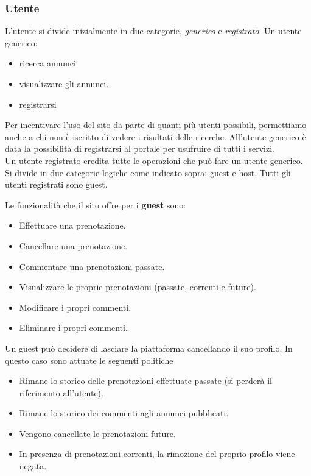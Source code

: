 \documentclass[1_relazione.tex]{subfiles}
\begin{document}
\subsubsection{Utente} 
L'utente si divide inizialmente in due categorie, \textit{generico} e \textit{registrato}. Un utente generico:
\begin{itemize}
\item ricerca annunci 
\item visualizzare gli annunci.
\item registrarsi
\end{itemize}
 Per incentivare l'uso del sito da parte di quanti più utenti possibili, permettiamo anche a chi non è iscritto di vedere i risultati delle ricerche. All'utente generico è data la possibilità di registrarsi al portale per usufruire di tutti i servizi.  \\
Un utente registrato eredita tutte le operazioni che può fare un utente generico. Si divide in due categorie logiche come indicato sopra: guest e host. Tutti gli utenti registrati sono guest. 

Le funzionalità che il sito offre per i \textbf{guest} sono: 
\begin{itemize}
\item Effettuare una prenotazione.
\item Cancellare una prenotazione.
\item Commentare una prenotazioni passate.
\item Visualizzare le proprie prenotazioni (passate, correnti e future).
\item Modificare i propri commenti.
\item Eliminare i propri commenti.
\end{itemize}

Un guest può decidere di lasciare la piattaforma cancellando il suo profilo. In questo caso sono attuate le seguenti politiche

\begin{itemize}
\item Rimane lo storico delle prenotazioni effettuate passate (si perderà il riferimento all'utente).
\item Rimane lo storico dei commenti agli annunci pubblicati.
\item Vengono cancellate le prenotazioni future.
\item In presenza di prenotazioni correnti, la rimozione del proprio profilo viene negata.
\end{itemize}
\end{document}
